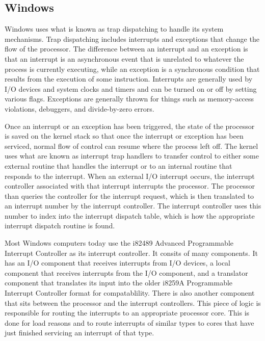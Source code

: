 \documentclass[journal,letterpaper,draftclsnofoot,onecolumn,10pt]{IEEEtran}
\begin{document}
\subsection{Windows}

Windows uses what is known as trap dispatching to handle its system mechanisms. Trap dispatching includes interrupts and exceptions that change the flow of the processor. The difference between an interrupt and an exception is that an interrupt is an asynchronous event that is unrelated to whatever the process is currently executing, while an exception is a synchronous condition that results from the execution of some instruction. Interrupts are generally used by I/O devices and system clocks and timers and can be turned on or off by setting various flags. Exceptions are generally thrown for things such as memory-access violations, debuggers, and divide-by-zero errors.\cite{1ris12}

Once an interrupt or an exception has been triggered, the state of the processor is saved on the kernel stack so that once the interrupt or exception has been serviced, normal flow of control can resume where the process left off. The kernel uses what are known as interrupt trap handlers to transfer control to either some external routine that handles the interrupt or to an internal routine that responds to the interrupt. When an external I/O interrupt occurs, the interrupt controller associated with that interrupt interrupts the processor. The processor than queries the controller for the interrupt request, which is then translated to an interrupt number by the interrupt controller. The interrupt controller uses this number to index into the interrupt dispatch table, which is how the appropriate interrupt dispatch routine is found.\cite{1ris12}

Most Windows computers today use the i82489 Advanced Programmable Interrupt Controller as its interrupt controller. It consits of many components. It has an I/O component that receives interrupts from I/O devices, a local component that receives interrupts from the I/O component, and a translator component that translates its input into the older i8259A Programmable Interrupt Controller format for compatablility. There is also another component that sits between the processor and the interrupt controllers. This piece of logic is responsible for routing the interrupts to an appropriate processor core. This is done for load reasons and to route interrupts of similar types to cores that have just finished servicing an interrupt of that type.\cite{1ris12}
\end{document}
